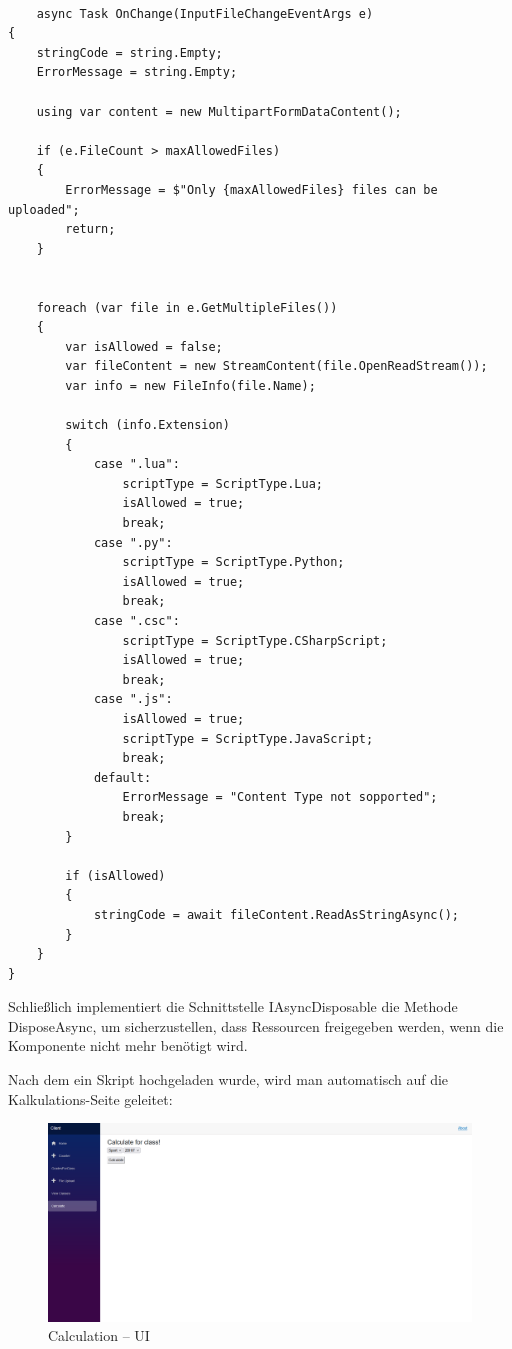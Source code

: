 \begin{lstlisting}[language={[Sharp]C}, caption=Code for OnAfterRenderAsync, label=lst:imp:OnAfterRenderAsync]

    async Task OnChange(InputFileChangeEventArgs e)
{
    stringCode = string.Empty;
    ErrorMessage = string.Empty;

    using var content = new MultipartFormDataContent();

    if (e.FileCount > maxAllowedFiles)
    {
        ErrorMessage = $"Only {maxAllowedFiles} files can be uploaded";
        return;
    }


    foreach (var file in e.GetMultipleFiles())
    {
        var isAllowed = false;
        var fileContent = new StreamContent(file.OpenReadStream());
        var info = new FileInfo(file.Name);

        switch (info.Extension)
        {
            case ".lua":
                scriptType = ScriptType.Lua;
                isAllowed = true;
                break;
            case ".py":
                scriptType = ScriptType.Python;
                isAllowed = true;
                break;
            case ".csc":
                scriptType = ScriptType.CSharpScript;
                isAllowed = true;
                break;
            case ".js":
                isAllowed = true;
                scriptType = ScriptType.JavaScript;
                break;
            default:
                ErrorMessage = "Content Type not sopported";
                break;
        }

        if (isAllowed)
        {
            stringCode = await fileContent.ReadAsStringAsync();
        }
    }
}
\end{lstlisting}

Schließlich implementiert die Schnittstelle IAsyncDisposable die Methode DisposeAsync, um sicherzustellen, dass Ressourcen freigegeben werden, wenn die Komponente nicht mehr benötigt wird.

\newpage
Nach dem ein Skript hochgeladen wurde, wird man automatisch auf die Kalkulations-Seite geleitet:

\begin{figure}[H]
    \centering
    \includegraphics[scale=0.5]{pics/CalculationUI.png}
    \caption{Calculation -- UI}
    \label{fig:impl:CalculationUI}
\end{figure}

